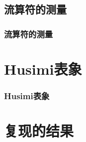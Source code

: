 \documentclass[UTF8]{beamer}
\begin{document}
\subsection{流算符的测量}
\begin{frame}\frametitle{流算符的测量}

\end{frame}
%
\section{Husimi表象}
\begin{frame}\frametitle{Husimi表象}
    
\end{frame}
%
\section{复现的结果}
\end{document}

